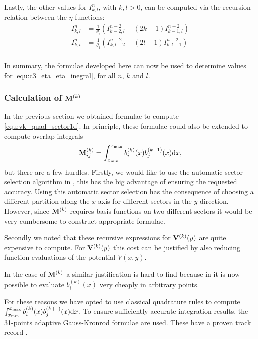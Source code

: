 Lastly, the other values for $I_{k,l}^n$, with $k, l > 0$, can be computed via the recursion relation between the $\eta$-functions:
\begin{align*}
  I_{k, l}^n & = \frac{1}{\theta_i} \left(I_{k-2,l}^{n-2} - (2k - 1) I_{k-1,l}^{n-2}\right) \\
  I_{k, l}^n & = \frac{1}{\theta_j} \left(I_{k,l-2}^{n-2} - (2l - 1) I_{k,l-1}^{n-2}\right) \\
\end{align*}

In summary, the formulae developed here can now be used to determine values for \eqref{equ:c3_eta_eta_inegral}, for all $n$, $k$ and $l$.

\subsubsection{Calculation of \texorpdfstring{$\vb{M}^{(k)}$}{M(k)}}

In the previous section we obtained formulae to compute \eqref{equ:vk_quad_sector1d}. In principle, these formulae could also be extended to compute overlap integrals
$$
  \vb{M}_{ij}^{(k)} = \int_{{x_{\text{min}}}}^{{x_{\text{max}}}}b_i^{(k)}(x)b_j^{(k+1)}(x)\dd x\text{,}
$$
but there are a few hurdles. Firstly, we would like to use the automatic sector selection algorithm in \matslise{}, this has the big advantage of ensuring the requested accuracy. Using this automatic sector selection has the consequence of choosing a different partition along the $x$-axis for different sectors in the $y$-direction. However, since $\vb{M}^{(k)}$ requires basis functions on two different sectors it would be very cumbersome to construct appropriate formulae.

Secondly we noted that these recursive expressions for $\vb{V}^{(k)}(y)$ are quite expensive to compute. For $\vb{V}^{(k)}(y)$ this cost can be justified by also reducing function evaluations of the potential $V(x, y)$.

In the case of $\vb{M}^{(k)}$ a similar justification is hard to find because in  it is now possible to evaluate $b^{(k)}_i(x)$ very cheaply in arbitrary points.

For these reasons we have opted to use classical quadrature rules to compute $\int_{{x_{\text{min}}}}^{{x_{\text{max}}}}b_i^{(k)}(x)b_j^{(k+1)}(x)\dd x$. To ensure sufficiently accurate integration results, the 31-points adaptive Gauss-Kronrod formulae are used. These have a proven track record \cite{piessens_quadpack_1983}.



